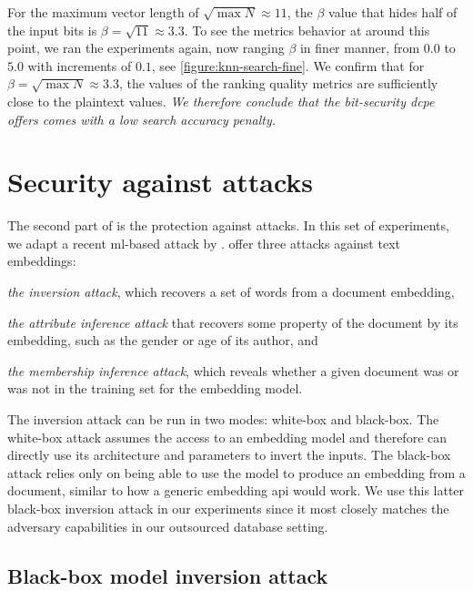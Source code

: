 				For the maximum vector length of $\sqrt{\max N} \approx 11$, the $\beta$ value that hides half of the input bits is $\beta = \sqrt{11} \approx 3.3$.
				To see the metrics behavior at around this point, we ran the experiments again, now ranging $\beta$ in finer manner, from $0.0$ to $5.0$ with increments of $0.1$, see \cref{figure:knn-search-fine}.
				We confirm that for $\beta = \sqrt{\max N} \approx 3.3$, the values of the ranking quality metrics are sufficiently close to the plaintext values.
				\emph{We therefore conclude that the bit-security \acrshort{dcpe} offers comes with a low search accuracy penalty.}

				

	\section{Security against attacks}\label{section:knn-snapshot:attacks}

		The second part of \kanon{} is the protection against attacks.
		In this set of experiments, we adapt a recent \acrshort{ml}-based attack by \textcite{embedding-attacks}.
		\textcite{embedding-attacks} offer three attacks against text embeddings:
		\begin{enumerate*}[label={(\roman*)}]
			\item \emph{the inversion attack}, which recovers a set of words from a document embedding,
			\item \emph{the attribute inference attack} that recovers some property of the document by its embedding, such as the gender or age of its author, and
			\item \emph{the membership inference attack}, which reveals whether a given document was or was not in the training set for the embedding model.
		\end{enumerate*}
		The inversion attack can be run in two modes: white-box and black-box.
		The white-box attack assumes the access to an embedding model and therefore can directly use its architecture and parameters to invert the inputs.
		The black-box attack relies only on being able to use the model to produce an embedding from a document, similar to how a generic embedding \acrshort{api} would work.
		We use this latter black-box inversion attack in our experiments since it most closely matches the adversary capabilities in our outsourced database setting.

		\subsection{Black-box model inversion attack \texorpdfstring{\cite{embedding-attacks}}{}}


